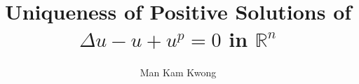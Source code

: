 \documentclass[]{article}
\begin{document}
\title{Uniqueness of Positive Solutions of $\Delta u - u + u^p = 0$ in $\mathbb{R}^n$}
\author{Man Kam Kwong}
\maketitle









\end{document}
